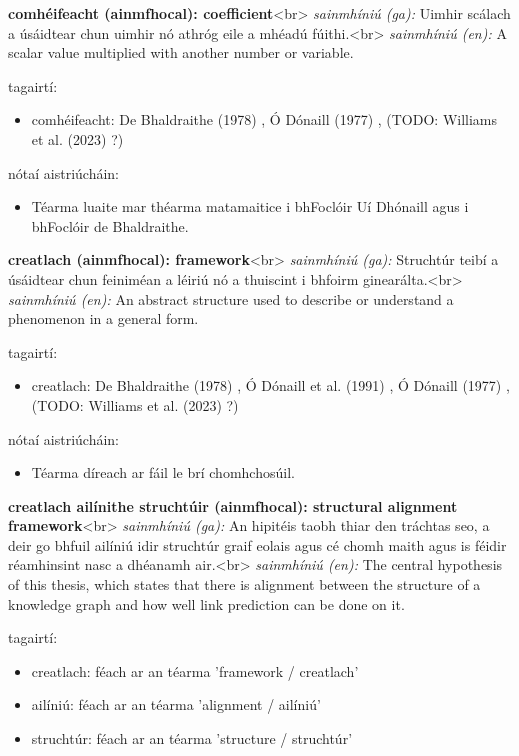 \documentclass{article}
\begin{document}
\textbf{comhéifeacht (ainmfhocal): coefficient}<br>
\textit{sainmhíniú (ga):} Uimhir scálach a úsáidtear chun uimhir nó athróg eile a mhéadú fúithi.<br>
\textit{sainmhíniú (en):} A scalar value multiplied with another number or variable.

tagairtí:
\begin{itemize}
	\item comhéifeacht: De Bhaldraithe (1978) \cite{de-bhaldraithe}, Ó Dónaill (1977) \cite{odonaill}, (TODO: Williams et al. (2023) \cite{storchiste}?)
\end{itemize}

nótaí aistriúcháin:
\begin{itemize}
	\item Téarma luaite mar théarma matamaitice i bhFoclóir Uí Dhónaill agus i bhFoclóir de Bhaldraithe.
\end{itemize}


\textbf{creatlach (ainmfhocal): framework}<br>
\textit{sainmhíniú (ga):} Struchtúr teibí a úsáidtear chun feiniméan a léiriú nó a thuiscint i bhfoirm ginearálta.<br>
\textit{sainmhíniú (en):} An abstract structure used to describe or understand a phenomenon in a general form.

tagairtí:
\begin{itemize}
	\item creatlach: De Bhaldraithe (1978) \cite{de-bhaldraithe}, Ó Dónaill et al. (1991) \cite{focloir-beag}, Ó Dónaill (1977) \cite{odonaill}, (TODO: Williams et al. (2023) \cite{storchiste}?)
\end{itemize}

nótaí aistriúcháin:
\begin{itemize}
	\item Téarma díreach ar fáil le brí chomhchosúil.
\end{itemize}


\textbf{creatlach ailínithe struchtúir (ainmfhocal): structural alignment framework}<br>
\textit{sainmhíniú (ga):} An hipitéis taobh thiar den tráchtas seo, a deir go bhfuil ailíniú idir struchtúr graif eolais agus cé chomh maith agus is féidir réamhinsint nasc a dhéanamh air.<br>
\textit{sainmhíniú (en):} The central hypothesis of this thesis, which states that there is alignment between the structure of a knowledge graph and how well link prediction can be done on it.

tagairtí:
\begin{itemize}
	\item creatlach: féach ar an téarma 'framework / creatlach'
	\item ailíniú: féach ar an téarma 'alignment / ailíniú'
	\item struchtúr: féach ar an téarma 'structure / struchtúr'
\end{itemize}
\end{document}

